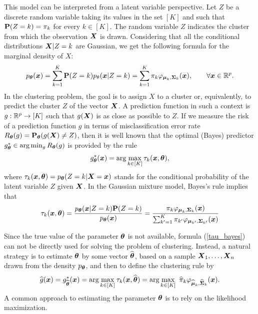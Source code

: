 This model can be interpreted from a latent variable perspective. Let $Z$ be a discrete random variable
taking its values in the set $[K]$ and such that $\mathbf P(Z=k) = \pi_k$ for every $k\in[K]$. The random variable $Z$
indicates the cluster from which the observation $\boldsymbol X$ is drawn.  Considering that all the conditional distributions
$\boldsymbol X|Z=k$ are Gaussian, we get the following formula for the marginal density of $X$:
\begin{equation}
p_{{\boldsymbol\theta}}(\boldsymbol x)=\sum_{k=1}^K \mathbf P(Z=k)p_{\theta}(\boldsymbol x|Z=k) = \sum_{k=1}^K\pi_k\varphi_{\boldsymbol\mu_k,\boldsymbol\Sigma_k}(\boldsymbol x),\qquad \forall \boldsymbol x\in{\mathbb R}^p.
\end{equation}
In the clustering problem, the goal is to assign $X$ to a cluster or, equivalently, to predict the cluster $Z$ of the vector $\boldsymbol X$.
A prediction function in such a context is $g:{\mathbb R}^p\to[K]$ such that $g(\boldsymbol X)$ is as close as possible to $Z$. If we measure the
risk of a prediction function $g$ in terms of misclassification error rate $R_{\boldsymbol\theta}(g) = \mathbf P_{\boldsymbol\theta}(g(\boldsymbol X)\not=Z)$, then it is
well known that the optimal (Bayes) predictor $g^*_{\boldsymbol\theta} \in \arg\min_g R_{\boldsymbol\theta}(g)$ is provided by the rule
$$
g^*_{\boldsymbol\theta}(\boldsymbol x) = \arg\max_{k\in [K]} \tau_k(\boldsymbol x,{\boldsymbol\theta}),
$$
where $\tau_k(\boldsymbol x,{\boldsymbol\theta})=p_{{\boldsymbol\theta}}(Z=k|\boldsymbol X=\boldsymbol x)$ stands for the conditional probability of the latent variable $Z$ given $\boldsymbol X$.
In the Gaussian mixture model, Bayes's rule implies that
\begin{equation}
\label{tau_bayes}
\tau_k(\boldsymbol x,{\boldsymbol\theta})=\frac{p_{{\boldsymbol\theta}}(\boldsymbol x|Z=k)\mathbf P(Z=k)}{p_{{\boldsymbol\theta}}(\boldsymbol x)}
=\frac{\pi_k\varphi_{\boldsymbol\mu_k,\boldsymbol\Sigma_k}(\boldsymbol x)}{\sum_{k'=1}^K\pi_{k'}\varphi_{\boldsymbol\mu_{k'},\boldsymbol\Sigma_{k'}}(\boldsymbol x)}
\end{equation}


Since the true value of the parameter ${\boldsymbol\theta}$ is not available, formula (\ref{tau_bayes}) can not be
directly used for solving the problem of clustering. Instead, a natural strategy is to estimate ${\boldsymbol\theta}$
by some vector $\widehat{{\boldsymbol\theta}}$, based on a sample $\boldsymbol X_1,\ldots,\boldsymbol X_n$ drawn from the density $p_{\boldsymbol\theta}$, and
then to define the clustering rule by
\begin{equation}
\label{gen_clust}
\widehat g(\boldsymbol x) = g^*_{\widehat{{\boldsymbol\theta}}}(\boldsymbol x)=\arg\max_{k\in [K]} \tau_k(\boldsymbol x,\widehat{{\boldsymbol\theta}})=\arg\max_{k\in [K]}\
\widehat\pi_k\varphi_{\widehat{\boldsymbol\mu}_k,\widehat{\boldsymbol\Sigma}_k}(\boldsymbol x).
\end{equation}
A common approach to estimating the parameter ${\boldsymbol\theta}$ is to rely on the likelihood maximization.

